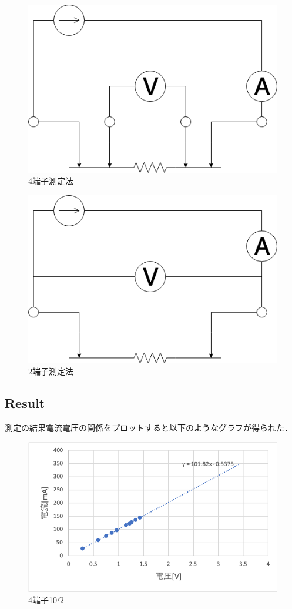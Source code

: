 \documentclass[11pt, a4paper,twocolumn]{jarticle}
\begin{document}
\begin{figure}[htbp]
 \begin{center}
  \includegraphics[width=0.8\linewidth]{fig1.png}
 \end{center}
 \caption{4端子測定法}
 \label{fig:1}
\end{figure}
\newpage
\begin{figure}[htbp]
 \begin{center}
  \includegraphics[width=0.8\linewidth]{fig2.png}
 \end{center}
 \caption{2端子測定法}
 \label{fig:2}
\end{figure}

\subsection{Result}
測定の結果電流電圧の関係をプロットすると以下のようなグラフが得られた．

\begin{figure}[htbp]
 \begin{center}
  \includegraphics[width=0.8\linewidth]{fig4.png}
 \end{center}
 \caption{4端子10$\Omega$}
 \label{fig:4}
\end{figure}
\end{document}
